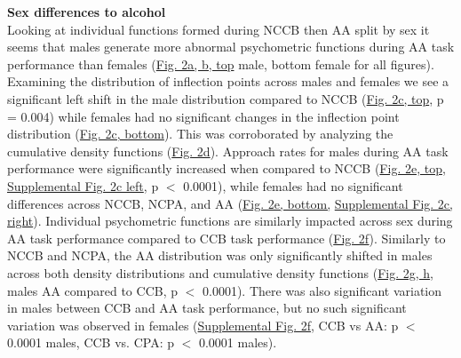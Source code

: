 \documentclass{article}
\begin{document}
\vspace{1em}

\noindent\textbf{Sex differences to alcohol}\\
Looking at individual functions formed during NCCB then AA split by sex it seems that males generate more abnormal psychometric functions during AA task performance than females (\hyperref[fig:alcohol_main_2]{Fig. 2a, b, top} male, bottom female for all figures). Examining the distribution of inflection points across males and females we see a significant left shift in the male distribution compared to NCCB (\hyperref[fig:alcohol_main_2]{Fig. 2c, top}, p = 0.004) while females had no significant changes in the inflection point distribution (\hyperref[fig:alcohol_main_2]{Fig. 2c, bottom}). This was corroborated by analyzing the cumulative density functions (\hyperref[fig:alcohol_main_2]{Fig. 2d}). Approach rates for males during AA task performance were significantly increased when compared to NCCB (\hyperref[fig:alcohol_main_2]{Fig. 2e, top}, \hyperref[fig:Alcohol_SI_2]{Supplemental Fig. 2c left}, p $<$ 0.0001), while females had no significant differences across NCCB, NCPA, and AA (\hyperref[fig:alcohol_main_2]{Fig. 2e, bottom,} \hyperref[fig:Alcohol_SI_2]{Supplemental Fig. 2c, right}). Individual psychometric functions are similarly impacted across sex during AA task performance compared to CCB task performance (\hyperref[fig:alcohol_main_2]{Fig. 2f}). Similarly to NCCB and NCPA, the AA distribution was only significantly shifted in males across both density distributions and cumulative density functions (\hyperref[fig:alcohol_main_2]{Fig. 2g, h}, males AA compared to CCB, p $<$ 0.0001). There was also significant variation in males between CCB and AA task performance, but no such significant variation was observed in females (\hyperref[fig:Alcohol_SI_2]{Supplemental Fig. 2f}, CCB vs AA: p $<$ 0.0001 males, CCB vs. CPA: p $<$ 0.0001 males).
\end{document}
